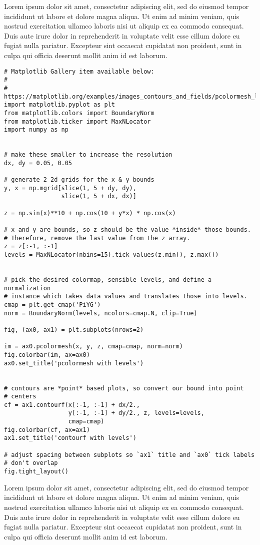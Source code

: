 Lorem ipsum dolor sit amet, consectetur adipiscing elit, sed do eiusmod
tempor incididunt ut labore et dolore magna aliqua. Ut enim ad minim
veniam, quis nostrud exercitation ullamco laboris nisi ut aliquip ex ea
commodo consequat. Duis aute irure dolor in reprehenderit in voluptate
velit esse cillum dolore eu fugiat nulla pariatur. Excepteur sint
occaecat cupidatat non proident, sunt in culpa qui officia deserunt
mollit anim id est laborum.

\begin{verbatim}
# Matplotlib Gallery item available below:
#
#   https://matplotlib.org/examples/images_contours_and_fields/pcolormesh_levels.html
import matplotlib.pyplot as plt
from matplotlib.colors import BoundaryNorm
from matplotlib.ticker import MaxNLocator
import numpy as np


# make these smaller to increase the resolution
dx, dy = 0.05, 0.05

# generate 2 2d grids for the x & y bounds
y, x = np.mgrid[slice(1, 5 + dy, dy),
                slice(1, 5 + dx, dx)]

z = np.sin(x)**10 + np.cos(10 + y*x) * np.cos(x)

# x and y are bounds, so z should be the value *inside* those bounds.
# Therefore, remove the last value from the z array.
z = z[:-1, :-1]
levels = MaxNLocator(nbins=15).tick_values(z.min(), z.max())


# pick the desired colormap, sensible levels, and define a normalization
# instance which takes data values and translates those into levels.
cmap = plt.get_cmap('PiYG')
norm = BoundaryNorm(levels, ncolors=cmap.N, clip=True)

fig, (ax0, ax1) = plt.subplots(nrows=2)

im = ax0.pcolormesh(x, y, z, cmap=cmap, norm=norm)
fig.colorbar(im, ax=ax0)
ax0.set_title('pcolormesh with levels')


# contours are *point* based plots, so convert our bound into point
# centers
cf = ax1.contourf(x[:-1, :-1] + dx/2.,
                  y[:-1, :-1] + dy/2., z, levels=levels,
                  cmap=cmap)
fig.colorbar(cf, ax=ax1)
ax1.set_title('contourf with levels')

# adjust spacing between subplots so `ax1` title and `ax0` tick labels
# don't overlap
fig.tight_layout()
\end{verbatim}

Lorem ipsum dolor sit amet, consectetur adipiscing elit, sed do eiusmod
tempor incididunt ut labore et dolore magna aliqua. Ut enim ad minim
veniam, quis nostrud exercitation ullamco laboris nisi ut aliquip ex ea
commodo consequat. Duis aute irure dolor in reprehenderit in voluptate
velit esse cillum dolore eu fugiat nulla pariatur. Excepteur sint
occaecat cupidatat non proident, sunt in culpa qui officia deserunt
mollit anim id est laborum.